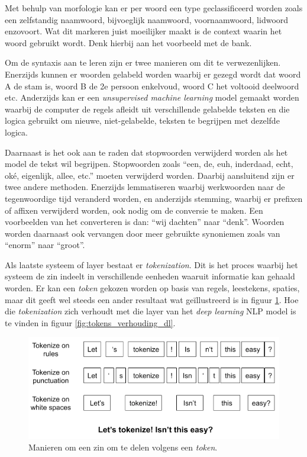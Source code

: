 Met behulp van morfologie kan er per woord een type geclassificeerd worden zoals een zelfstandig naamwoord, bijvoeglijk naamwoord, voornaamwoord, lidwoord enzovoort. Wat dit markeren juist moeilijker maakt is de context waarin het woord gebruikt wordt. Denk hierbij aan het voorbeeld met de bank.

Om de syntaxis aan te leren zijn er twee manieren om dit te verwezenlijken. Enerzijds kunnen er woorden gelabeld worden waarbij er gezegd wordt dat woord A de stam is, woord B de 2e persoon enkelvoud, woord C het voltooid deelwoord etc. Anderzijds kan er een \textit{unsupervised machine learning} model gemaakt worden waarbij de computer de regels afleidt uit verschillende gelabelde teksten en die logica gebruikt om nieuwe, niet-gelabelde, teksten te begrijpen met dezelfde logica.

Daarnaast is het ook aan te raden dat stopwoorden verwijderd worden als het model de tekst wil begrijpen. Stopwoorden zoals ``een, de, euh, inderdaad, echt, oké, eigenlijk, allee, etc.'' moeten verwijderd worden. Daarbij aansluitend zijn er twee andere methoden. Enerzijds lemmatiseren waarbij  werkwoorden naar de tegenwoordige tijd veranderd worden, en anderzijds stemming, waarbij er prefixen of affixen verwijderd worden, ook nodig om de conversie te maken. Een voorbeelden van het converteren is dan: ``wij dachten'' naar ``denk''. Woorden worden daarnaast ook vervangen door meer gebruikte synoniemen zoals van ``enorm'' naar ``groot''.

Als laatste systeem of layer bestaat er \textit{tokenization}. Dit is het proces waarbij het systeem de zin indeelt in verschillende eenheden waaruit informatie kan gehaald worden.
Er kan een \textit{token} gekozen worden op basis van regels, leestekens, spaties, maar dit geeft wel steeds een ander resultaat wat geïllustreerd is in figuur \ref{fig:tokens}. Hoe die \textit{tokenization} zich verhoudt met die layer van het \textit{deep learning} NLP model is te vinden in figuur \ref{fig:tokens_verhouding_dl}.

\begin{figure}
    \centering
    \includegraphics[width=1\textwidth]{./img/tokenize_manier.png}
    \caption{\label{fig:tokens} Manieren om een zin om te delen volgens een \textit{token}.~\autocite{Horan2020}}
\end{figure}


